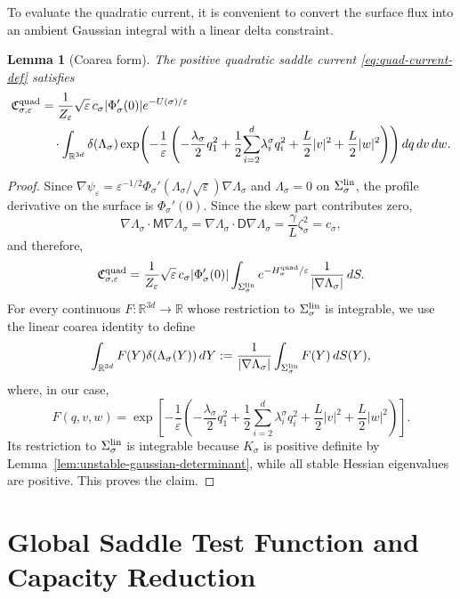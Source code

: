 \documentclass[11pt]{article}
\numberwithin{equation}{section}
\theoremstyle{plain}
\newtheorem{lemma}[theorem]{Lemma}
\theoremstyle{definition}
\theoremstyle{remark}
\newcommand{\R}{\mathbb R}
\newcommand{\eps}{\varepsilon}
\begin{document}
To evaluate the quadratic current, it is convenient to convert
the surface flux into an ambient Gaussian integral with a linear delta
constraint.

\begin{lemma}[Coarea form]
\label{lem:quadratic-flux-coarea}
The positive quadratic saddle current \eqref{eq:quad-current-def} satisfies
\[
\begin{aligned}
\mathfrak C_{\sigma,\eps}^{\rm quad}
&=\frac{1}{Z_\eps}\sqrt\eps\,c_\sigma|\Phi_\sigma'(0)|e^{-U(\sigma)/\eps} \\
&\quad\cdot
\int_{\R^{3d}}
\delta(\Lambda_\sigma)
\exp\!\left(-\frac1\eps\left(-\frac{\lambda_\sigma}{2}q_1^2
+\frac12\!\sum_{i=2}^d\!\lambda_i^\sigma q_i^2+\frac L2|v|^2+\frac L2|w|^2\right)\right)
dq\,dv\,dw .
\end{aligned}
\]
\end{lemma}

\begin{proof}
Since $\nabla\psi_\eps=\eps^{-1/2}\Phi_\sigma'(\Lambda_\sigma/\sqrt\eps)\nabla\Lambda_\sigma$
and $\Lambda_\sigma=0$ on $\Sigma_\sigma^{\rm lin}$, the profile derivative on
the surface is $\Phi_\sigma'(0)$. 
Since the skew part contributes zero,
\[
\nabla\Lambda_\sigma\cdot\mathsf M\nabla\Lambda_\sigma
=\nabla\Lambda_\sigma\cdot\mathsf D\nabla\Lambda_\sigma
=\frac{\gamma}{L}\zeta_\sigma^2=c_\sigma,
\]
and therefore,
\[
\mathfrak C_{\sigma,\eps}^{\rm quad}
=\frac{1}{Z_\eps}\sqrt\eps\,c_\sigma|\Phi_\sigma'(0)|
\int_{\Sigma_\sigma^{\rm lin}}
e^{-H_\sigma^{\rm quad}/\eps}\frac{1}{|\nabla\Lambda_\sigma|}\,dS .
\]
For every continuous $F:\R^{3d}\to\R$ whose restriction to
$\Sigma_\sigma^{\rm lin}$ is integrable, we use the linear coarea identity
to define
\[
\int_{\R^{3d}}F(Y)\delta(\Lambda_\sigma(Y))\,dY
:=\frac1{|\nabla\Lambda_\sigma|}
\int_{\Sigma_\sigma^{\rm lin}}F(Y)\,dS(Y),
\]
where, in our case,
\[
F(q,v,w)=
\exp\!\left[-\frac1\eps\left(-\frac{\lambda_\sigma}{2}q_1^2
+\frac12\sum_{i=2}^d\lambda_i^\sigma q_i^2
+\frac L2|v|^2+\frac L2|w|^2\right)\right].
\]
Its restriction to $\Sigma_\sigma^{\rm lin}$ is integrable because
$K_\sigma$ is positive definite by
Lemma~\ref{lem:unstable-gaussian-determinant}, while all stable Hessian
eigenvalues are positive.
This proves the claim.
\end{proof}

\section{Global Saddle Test Function and Capacity Reduction}
\label{app:global-saddle-test}
\end{document}
